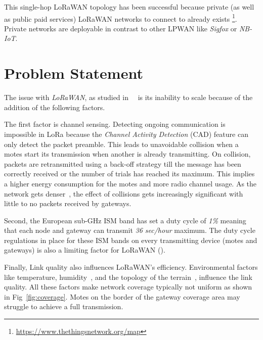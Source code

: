 This single-hop LoRaWAN topology has been successful because private (as well as public paid
services) LoRaWAN networks to connect to already exists
\footnote{\url{https://www.thethingsnetwork.org/map}}.
Private networks are deployable in contrast to other LPWAN like \emph{Sigfox} or \emph{NB-IoT}.




\section{Problem Statement}

The issue with \emph{LoRaWAN}, as studied
in~\cite{8030482}~\cite{10.1145/2988287.2989163} is its inability to scale
because of the addition of the following factors.

The first factor is channel sensing.
Detecting ongoing communication is impossible in LoRa because the \emph{Channel Activity Detection}
(CAD) feature can only detect the packet preamble.
This leads to unavoidable collision when a motes start its transmission
when another is already transmitting.
On collision, packets are retransmitted using a back-off strategy till the
message has been correctly received or the number of trials has reached its
maximum.
This implies a higher energy consumption for the motes and more radio
channel usage.
As the network gets denser~\cite{8030482}, the effect of collisions gets
increasingly significant with little to no packets received by gateways.


Second, the European sub-GHz ISM band has set a duty cycle of \emph{1\%} meaning that
each node and gateway can transmit \emph{36 sec/hour} maximum.
The duty cycle regulations in place for these ISM bands on every
transmitting device (motes and gateways) is also a limiting factor
for LoRaWAN (\cite{8030482}).


Finally, Link quality also influences LoRaWAN's efficiency.
Environmental factors like temperature,
humidity~\cite{evaluation_of_the_reliability_of_lora}, and the topology of the
terrain~\cite{lorajambalaya}, influence the link quality.
All these factors make network coverage typically not uniform
as shown in Fig~\ref{fig:coverage}.
Motes on the border of the gateway coverage area may struggle to
achieve a full transmission.

